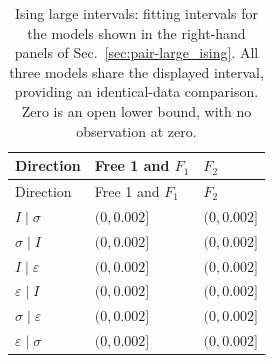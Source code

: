 \begingroup\setlength{\tabcolsep}{2pt}
\begin{longtable}{lll}
\caption{Ising large intervals: fitting intervals for the models shown in the right-hand panels of Sec.~\ref{sec:pair-large_ising}. All three models share the displayed interval, providing an identical-data comparison. Zero is an open lower bound, with no observation at zero.}
\label{tab:window-large_ising-ranges}\\\toprule
Direction & Free 1 and $F_1$ & $F_2$\\\midrule
\endfirsthead
\toprule
Direction & Free 1 and $F_1$ & $F_2$\\\midrule
\endhead
\bottomrule\endfoot
$I\mid \sigma$ & $(0,0.002]$ & $(0,0.002]$\\
$\sigma\mid I$ & $(0,0.002]$ & $(0,0.002]$\\
$I\mid \varepsilon$ & $(0,0.002]$ & $(0,0.002]$\\
$\varepsilon\mid I$ & $(0,0.002]$ & $(0,0.002]$\\
$\sigma\mid \varepsilon$ & $(0,0.002]$ & $(0,0.002]$\\
$\varepsilon\mid \sigma$ & $(0,0.002]$ & $(0,0.002]$\\
\end{longtable}
\endgroup
